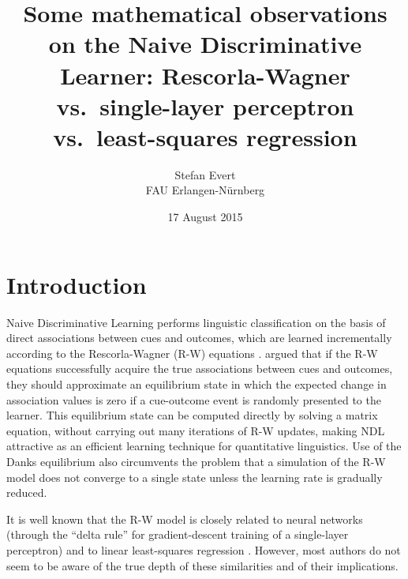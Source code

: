 \documentclass[a4paper,11pt]{article} %
\begin{document}
\title{Some mathematical observations on the Naive Discriminative Learner:
  Rescorla-Wagner vs.\ single-layer perceptron vs.\ least-squares regression}
\author{
  Stefan Evert\\
  FAU Erlangen-Nürnberg
}
\date{17 August 2015}
\maketitle


\tableofcontents{}



\section{Introduction}
\label{sec:intro}

Naive Discriminative Learning \citep[NDL,][]{Baayen:11} performs linguistic classification on the basis of direct associations between cues and outcomes, which are learned incrementally according to the Rescorla-Wagner (R-W) equations \citep{Rescorla:Wagner:72}. \citet{Danks:03} argued that if the R-W equations successfully acquire the true associations between cues and outcomes, they should approximate an equilibrium state in which the expected change in association values is zero if a cue-outcome event is randomly presented to the learner.  This equilibrium state can be computed directly by solving a matrix equation, without carrying out many iterations of R-W updates, making NDL attractive as an efficient learning technique for quantitative linguistics. Use of the Danks equilibrium also circumvents the problem that a simulation of the R-W model does not converge to a single state unless the learning rate is gradually reduced.

It is well known that the R-W model is closely related to neural networks (through the ``delta rule'' for gradient-descent training of a single-layer perceptron) and to linear least-squares regression \citep[e.g.][]{Danks:03,Baayen:11}.  However, most authors do not seem to be aware of the true depth of these similarities and of their implications.
\end{document}
